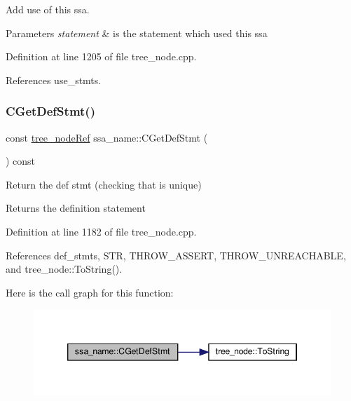Add use of this ssa. 


\begin{DoxyParams}{Parameters}
{\em statement} & is the statement which used this ssa \\
\hline
\end{DoxyParams}


Definition at line 1205 of file tree\+\_\+node.\+cpp.



References use\+\_\+stmts.

\mbox{\label{structssa__name_a5d12d1a11bc039f5e66a40c846cd3f0b}} 
\subsubsection{\texorpdfstring{C\+Get\+Def\+Stmt()}{CGetDefStmt()}}
{\footnotesize\ttfamily const \hyperlink{tree__node_8hpp_a6ee377554d1c4871ad66a337eaa67fd5}{tree\+\_\+node\+Ref} ssa\+\_\+name\+::\+C\+Get\+Def\+Stmt (\begin{DoxyParamCaption}{ }\end{DoxyParamCaption}) const}



Return the def stmt (checking that is unique) 

\begin{DoxyReturn}{Returns}
the definition statement 
\end{DoxyReturn}


Definition at line 1182 of file tree\+\_\+node.\+cpp.



References def\+\_\+stmts, S\+TR, T\+H\+R\+O\+W\+\_\+\+A\+S\+S\+E\+RT, T\+H\+R\+O\+W\+\_\+\+U\+N\+R\+E\+A\+C\+H\+A\+B\+LE, and tree\+\_\+node\+::\+To\+String().

Here is the call graph for this function\+:
\nopagebreak
\begin{figure}[H]
\begin{center}
\leavevmode
\includegraphics[width=346pt]{db/d2f/structssa__name_a5d12d1a11bc039f5e66a40c846cd3f0b_cgraph}
\end{center}
\end{figure}
\mbox{\label{structssa__name_acfdd901ceb0b0c109c6aeb8ab905aa16}} 
